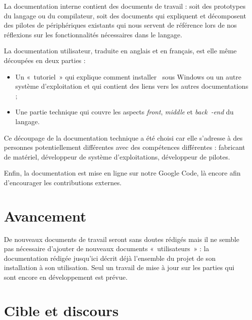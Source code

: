 \documentclass[francais]{rtxreport}
\begin{document}
La documentation interne contient des documents de travail : soit des prototypes
du langage ou du compilateur, soit des documents qui expliquent et décomposent
des pilotes de périphériques existants qui nous servent de référence lors de nos
réflexions sur les fonctionnalités nécessaires dans le langage.

La documentation utilisateur, traduite en anglais et en français, est elle même
découpées en deux parties :
\begin{itemize}
\item Un «~tutoriel~» qui explique comment installer \rtx\ sous Windows ou un
  autre système d'exploitation et qui contient des liens vers les autres
  documentations ;
\item Une partie technique qui couvre les aspects \emph{front}, \emph{middle} et
  \emph{back~-end} du langage.
\end{itemize}

Ce découpage de la documentation technique a été choisi car elle s'adresse à des
personnes potentiellement différentes avec des compétences différentes :
fabricant de matériel, développeur de système d'exploitations, développeur de
pilotes.

Enfin, la documentation est mise en ligne sur notre Google Code, là encore afin
d'encourager les contributions externes.

\section{Avancement}

De nouveaux documents de travail seront sans doutes rédigés mais il ne semble
pas nécessaire d'ajouter de nouveaux documents «~utilisateurs~» : la
documentation rédigée jusqu'ici décrit déjà l'ensemble du projet de son
installation à son utilisation. Seul un travail de mise à jour sur les parties
qui sont encore en développement est prévue.




\section{Cible et discours}
\end{document}
